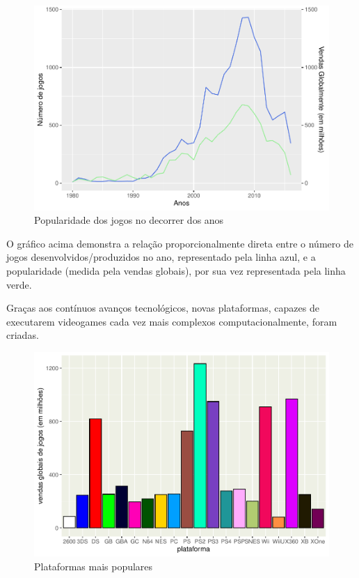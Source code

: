 \documentclass[draft]{agujournal2018}
\begin{document}
\begin{figure}[h]
\includegraphics{vendas_de_jogos_de_videogames_files/figure-latex/unnamed-chunk-4-1} \caption{Popularidade dos jogos no decorrer dos anos}\label{fig:unnamed-chunk-4}
\end{figure}

O gráfico acima demonstra a relação proporcionalmente direta entre o
número de jogos desenvolvidos/produzidos no ano, representado pela linha
azul, e a popularidade (medida pela vendas globais), por sua vez
representada pela linha verde.

Graças aos contínuos avanços tecnológicos, novas plataformas, capazes de
executarem videogames cada vez mais complexos computacionalmente, foram
criadas.

\begin{figure}[h]
\includegraphics{vendas_de_jogos_de_videogames_files/figure-latex/unnamed-chunk-5-1} \caption{Plataformas mais populares}\label{fig:unnamed-chunk-5}
\end{figure}
\end{document}
